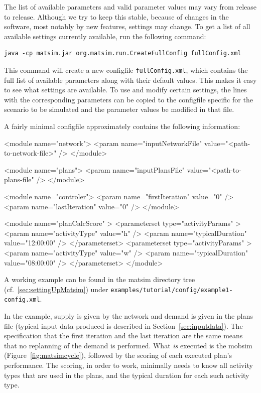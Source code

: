 The list of available parameters and valid parameter values may vary from release to release. Although we try to keep this stable,
because of changes in the software, most notably by new features, settings may change. To get a list of all available settings currently available, run the following command:
\begin{lstlisting}
java -cp matsim.jar org.matsim.run.CreateFullConfig fullConfig.xml
\end{lstlisting}
%
This command will create a new \gls{configfile} \lstinline|fullConfig.xml|, which contains the full list of available parameters along with their default values. This makes it easy to see what settings are available. To use and modify certain settings, the lines with the corresponding parameters can be copied to the \gls{configfile} specific for the \gls{scenario} to be simulated and the parameter values be modified in that file. 

A fairly minimal \gls{configfile} approximately contains the following information:
\begin{xml}
<module name="network">
   <param name="inputNetworkFile" value="<path-to-network-file>" />
</module>

<module name="plans">
   <param name="inputPlansFile" value="<path-to-plans-file" />
</module>

<module name="controler">
   <param name="firstIteration" value="0" />
   <param name="lastIteration" value="0" />
</module>

<module name="planCalcScore" >
   <parameterset type="activityParams" >
      <param name="activityType" value="h" />
      <param name="typicalDuration" value="12:00:00" />
   </parameterset>
   <parameterset type="activityParams" >
      <param name="activityType" value="w" />
      <param name="typicalDuration" value="08:00:00" />
   </parameterset>
</module>
\end{xml}
A working example can be found in the \gls{matsim} directory tree (cf.~\ref{sec:settingUpMatsim}) under \lstinline{examples/tutorial/config/example1-config.xml}.
 
In the example, supply is given by 
the network and demand is given in the plans file (typical input data produced is described in Section~\ref{sec:inputdata}). 
%
The specification that the first iteration and the last iteration are the same means that no \gls{replanning} of the demand is performed.  
%
What \emph{is} executed is the \gls{mobsim} (Figure~\ref{fig:matsimcycle}), followed by the scoring of each executed plan's performance.
%
The scoring, in order to work, minimally needs to know all activity types that are used in the plans, and the typical duration for each such activity type.

